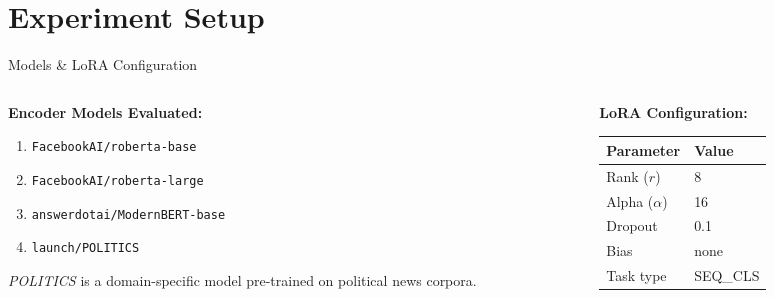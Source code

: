 \documentclass[aspectratio=169]{beamer}
\begin{document}
\section{Experiment Setup}

\begin{frame}{Models \& LoRA Configuration}
  \begin{columns}[T]
    \begin{column}{0.48\textwidth}
      \textbf{Encoder Models Evaluated:}
      \begin{enumerate}
        \item \texttt{FacebookAI/roberta-base}
        \item \texttt{FacebookAI/roberta-large}
        \item \texttt{answerdotai/ModernBERT-base}
        \item \texttt{launch/POLITICS}
      \end{enumerate}
      \vspace{0.3cm}
      \small
      \textit{POLITICS} is a domain-specific model pre-trained on political news corpora.
    \end{column}
    \begin{column}{0.48\textwidth}
      \textbf{LoRA Configuration:}
      \begin{table}
        \small
        \begin{tabular}{ll}
          \toprule
          \textbf{Parameter} & \textbf{Value} \\
          \midrule
          Rank ($r$)         & 8 \\
          Alpha ($\alpha$)   & 16 \\
          Dropout            & 0.1 \\
          Bias               & none \\
          Task type          & SEQ\_CLS \\
          \bottomrule
        \end{tabular}
      \end{table}
    \end{column}
  \end{columns}
\end{frame}
\end{document}
